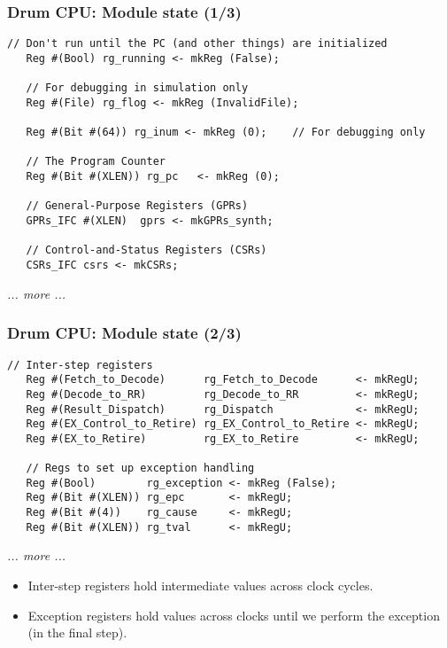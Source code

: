 
\begin{frame}[fragile]
\frametitle{Drum CPU: Module state (1/3)}

\footnotesize

\begin{minipage}{0.725\textwidth}
\begin{Verbatim}[frame=single, label=From src\_Drum/CPU.bsv]
   // Don't run until the PC (and other things) are initialized
   Reg #(Bool) rg_running <- mkReg (False);

   // For debugging in simulation only
   Reg #(File) rg_flog <- mkReg (InvalidFile);

   Reg #(Bit #(64)) rg_inum <- mkReg (0);    // For debugging only

   // The Program Counter
   Reg #(Bit #(XLEN)) rg_pc   <- mkReg (0);

   // General-Purpose Registers (GPRs)
   GPRs_IFC #(XLEN)  gprs <- mkGPRs_synth;

   // Control-and-Status Registers (CSRs)
   CSRs_IFC csrs <- mkCSRs;
\end{Verbatim}
\end{minipage}
\hm
\emph{... more ...}

\end{frame}


\begin{frame}[fragile]
\frametitle{Drum CPU: Module state (2/3)}

\footnotesize

\begin{minipage}{0.725\textwidth}
\begin{Verbatim}[frame=single, label=From src\_Drum/CPU.bsv]
   // Inter-step registers
   Reg #(Fetch_to_Decode)      rg_Fetch_to_Decode      <- mkRegU;
   Reg #(Decode_to_RR)         rg_Decode_to_RR         <- mkRegU;
   Reg #(Result_Dispatch)      rg_Dispatch             <- mkRegU;
   Reg #(EX_Control_to_Retire) rg_EX_Control_to_Retire <- mkRegU;
   Reg #(EX_to_Retire)         rg_EX_to_Retire         <- mkRegU;

   // Regs to set up exception handling
   Reg #(Bool)        rg_exception <- mkReg (False);
   Reg #(Bit #(XLEN)) rg_epc       <- mkRegU;
   Reg #(Bit #(4))    rg_cause     <- mkRegU;
   Reg #(Bit #(XLEN)) rg_tval      <- mkRegU;
\end{Verbatim}
\end{minipage}
\hm
\emph{... more ...}

\vspace{2ex}

\begin{itemize}
 \item Inter-step registers hold intermediate values across clock cycles.

 \item Exception registers hold values across clocks until we perform
       the exception (in the final step).
\end{itemize}

\end{frame}

